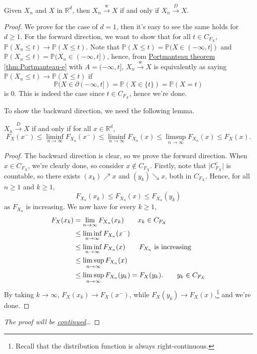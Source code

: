 \begin{theorem}\label{thm:weak-convergence-is-convergence-in-distribution}
	Given \(X_n\) and \(X\) in \(\mathbb{R} ^d\), then \(X_n \overset{\text{w} }{\to } X\) if and only if \(X_n \overset{D}{\to } X\).
\end{theorem}
\begin{proof}\let\qed\relax
	We prove for the case of \(d = 1\), then it's easy to see the same holds for \(d \geq 1\). For the forward direction, we want to show that for all \(t \in C_{F_X}\), \(\mathbb{P} (X_n \leq t) \to \mathbb{P} (X \leq t)\). Note that \(\mathbb{P} (X \leq t) = \mathbb{P} (X \in (-\infty , t])\) and \(\mathbb{P} (X_n \leq t) = \mathbb{P} (X_n \in (-\infty , t])\), hence, from \hyperref[thm:Portmanteau]{Portmanteau theorem} \autoref{thm:Portmanteau-e} with \(A = (-\infty , t]\), \(X_n \overset{\text{w} }{\to } X\) is equivalently as saying \(\mathbb{P} (X_n \leq t) \to \mathbb{P} (X \leq t)\) if
	\[
		\mathbb{P} (X \in \partial (-\infty , t])
		= \mathbb{P} (X \in \{ t \} )
		= \mathbb{P} (X = t)
	\]
	is \(0\). This is indeed the case since \(t \in C_{F_X}\), hence we're done.

	To show the backward direction, we need the following lemma.
	\begin{lemma}\label{lma:lec5}
		\(X_n \overset{D}{\to } X\) if and only if for all \(x \in \mathbb{R} ^d\),
		\[
			F_X(x^-)
			\leq \liminf_{n \to \infty} F_{X_n} (x^-)
			\leq \liminf_{n \to \infty} F_{X_n} (x)
			\leq \limsup_{n \to \infty} F_{X_n} (x)
			\leq F_X(x).
		\]
	\end{lemma}
	\begin{proof}
		The backward direction is clear, so we prove the forward direction. When \(x\in C_{F_X}\), we're clearly done, so consider \(x \notin C_{F_X}\). Firstly, note that \(\vert C_{F_X}^{c} \vert \) is countable, so there exists \((x_k) \nearrow x\) and \((y_k) \searrow x\), both in \(C_{F_X}\). Hence, for all \(n \geq 1\) and \(k \geq 1\),
		\[
			F_{X_n}(x_k)
			\leq F_{X_n}(x)
			\leq F_{X_n}(y_k)
		\]
		as \(F_{X_n}\) is increasing. We now have for every \(k \geq 1\),
		\begin{align*}
			F_X(x_k)
			 & = \lim_{n \to \infty} F_{X_n}(x_k) \tag*{\(x_k \in C_{F_X}\)}           \\
			 & \leq \liminf_{n \to \infty} F_{X_n}(x^-)                                \\
			 & \leq \liminf_{n \to \infty} F_{X_n}(x) \tag*{\(F_{X_n}\) is increasing} \\
			 & \leq \limsup_{n \to \infty} F_{X_n}(x)                                  \\
			 & \leq \limsup_{n \to \infty} F_{X_n}(y_k)
			= F_X(y_k). \tag*{\(y_k \in C_{F_X}\)}
		\end{align*}
		By taking \(k \to \infty \), \(F_X(x_k) \to F_X(x^-)\), while \(F_X(y_k) \to F_X(x)\),\footnote{Recall that the distribution function is always right-continuous.} and we're done.
	\end{proof}
	\emph{The proof will be \hyperref[pf:thm:weak-convergence-is-convergence-in-distribution]{continued}\dots}
\end{proof}